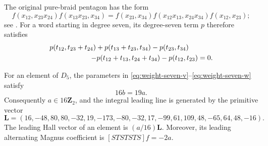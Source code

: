 The original pure-braid pentagon has the form
\[
 f(x_{12},x_{23}x_{24})f(x_{13}x_{23},x_{34})
 =f(x_{23},x_{34})f(x_{12}x_{13},x_{24}x_{34})f(x_{12},x_{23});
\]
see \cite[Remark~1.2, p.~98]{Furusho2003}.
For a word starting in degree seven, its degree-seven term $p$
therefore satisfies
\begin{equation}\label{eq:weight-seven-leading-pentagon}
\begin{split}
 p(t_{12},t_{23}+t_{24})+p(t_{13}+t_{23},t_{34})
 -p(t_{23},t_{34})\hspace{12mm}\\
 -p(t_{12}+t_{13},t_{24}+t_{34})-p(t_{12},t_{23})=0.
\end{split}
\end{equation}

\begin{lemma}\label{lem:weight-seven-integral-line}
For an element of $D_5$, the parameters in
\eqref{eq:weight-seven-v}--\eqref{eq:weight-seven-w} satisfy
\[
 16b=19a.
\]
Consequently $a\in16\mathbf Z_2$, and the integral leading line is
generated by the primitive vector
\begin{equation}\label{eq:weight-seven-primitive-vector}
\mathbf L=(16,-48,80,80,-32,19,-173,-80,-32,
           17,-99,61,109,48,-65,64,48,-16).
\end{equation}
The leading Hall vector of an element is $(a/16)\mathbf L$.
Moreover, its leading alternating Magnus coefficient is
$[STSTSTS]f=-2a$.
\end{lemma}

